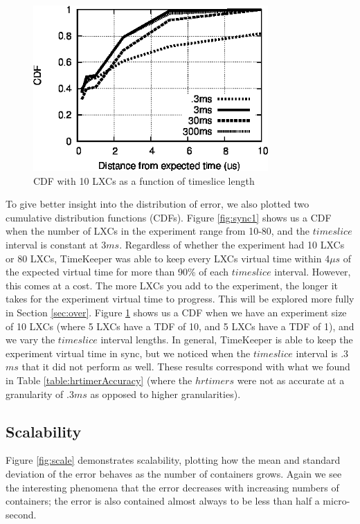 \begin{figure} \centering 
      \includegraphics[width=0.8\textwidth]{images/cdf_xms_10nodes.eps} 
    \caption{CDF with 10 LXCs as a function of timeslice length} 
    \label{fig:sync2} 
  \end{figure}

To give better insight into the distribution of error, we also plotted two cumulative distribution functions (CDFs). Figure \ref{fig:sync1} shows us a CDF when the number of LXCs in the experiment range from 10-80, and the $timeslice$ interval is constant at 3$ms$. Regardless of whether the experiment had 10 LXCs or 80 LXCs, TimeKeeper was able to keep every LXCs virtual time within 4$\mu s$ of the expected virtual time for more than 90\% of each $timeslice$ interval. However, this comes at a cost. The more LXCs you add to the experiment, the longer it takes for the experiment virtual time to progress. This will be explored more fully in Section \ref{sec:over}. Figure \ref{fig:sync2} shows us a CDF when we have an experiment size of 10 LXCs (where 5 LXCs have a TDF of 10, and 5 LXCs have a TDF of 1), and we vary the $timeslice$ interval lengths. In general, TimeKeeper is able to keep the experiment virtual time in sync, but we noticed when the $timeslice$ interval is .3$ms$ that it did not perform as well. These results correspond with what we found in Table \ref{table:hrtimerAccuracy} (where the $hrtimers$ were not as accurate at a granularity of .3$ms$ as opposed to higher granularities).

\subsection{Scalability}

Figure \ref{fig:scale} demonstrates scalability, plotting how the mean and standard deviation of the error behaves as the number of containers grows.  Again we see the interesting phenomena that the error decreases with increasing numbers of containers;  the error is also contained almost always to be less than half a micro-second. 

